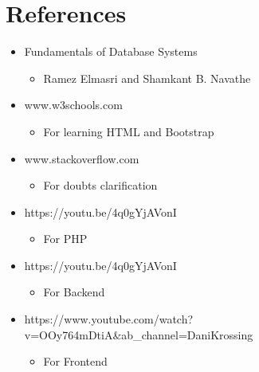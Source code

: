 \documentclass{report}
\begin{document}
\chapter{References}
\begin{itemize} 
\item Fundamentals of Database Systems
    \begin{itemize}
        \item Ramez Elmasri and Shamkant B. Navathe
    \end{itemize}
\item www.w3schools.com
    \begin{itemize}
        \item For learning HTML and Bootstrap
    \end{itemize}
\item www.stackoverflow.com
    \begin{itemize}
        \item For doubts clarification
    \end{itemize}
\item https://youtu.be/4q0gYjAVonI
    \begin{itemize}
        \item For PHP
    \end{itemize}
\item https://youtu.be/4q0gYjAVonI
    \begin{itemize}
        \item For Backend
    \end{itemize}
\item https://www.youtube.com/watch?v=OOy764mDtiA&ab_channel=DaniKrossing
    \begin{itemize}
        \item For Frontend
    \end{itemize}
\end{itemize}
\printindex
\end{document}
